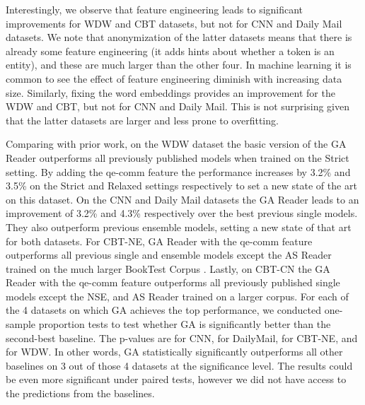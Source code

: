 \documentclass[11pt,a4paper]{article}
\begin{document}
Interestingly, we observe that feature engineering leads to significant improvements for WDW and CBT datasets, but not for CNN and Daily Mail datasets. We note that anonymization of the latter datasets means that there is already some feature engineering (it adds hints about whether a token is an entity), and these are much larger than the other four. In machine learning it is common to see the effect of feature engineering diminish with increasing data size. Similarly, fixing the word embeddings provides an improvement for the WDW and CBT, but not for CNN and Daily Mail. This is not surprising given that the latter datasets are larger and less prone to overfitting.

Comparing with prior work, on the WDW dataset the basic version of the GA Reader outperforms all previously published models when trained on the Strict setting. By adding the qe-comm feature the performance increases by 3.2\% and 3.5\% on the Strict and Relaxed settings respectively to set a new state of the art on this dataset. On the CNN and Daily Mail datasets the GA Reader leads to an improvement of 3.2\% and 4.3\% respectively over the best previous single models. They also outperform previous ensemble models, setting a new state of that art for both datasets. For CBT-NE, GA Reader with the qe-comm feature outperforms all previous single and ensemble models except the AS Reader trained on the much larger BookTest Corpus \citep{bajgar2016embracing}. Lastly, on CBT-CN the GA Reader with the qe-comm feature outperforms all previously published single models except the NSE, and AS Reader trained on a larger corpus. For each of the 4 datasets on which GA achieves the top performance, we conducted one-sample proportion tests to test whether GA is significantly better than the second-best baseline. The p-values are  for CNN,  for DailyMail,  for CBT-NE, and  for WDW. In other words, GA statistically significantly outperforms all other baselines on 3 out of those 4 datasets at the  significance level. The results could be even more significant under paired tests, however we did not have access to the predictions from the baselines.
\end{document}
